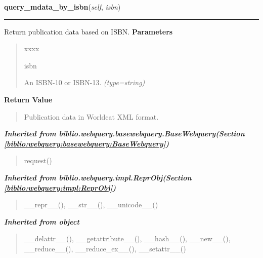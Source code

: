 \hspace{.8\funcindent}\begin{boxedminipage}{\funcwidth}

    \raggedright \textbf{query\_mdata\_by\_isbn}(\textit{self}, \textit{isbn})

    \vspace{-1.5ex}

    \rule{\textwidth}{0.5\fboxrule}
\setlength{\parskip}{2ex}

Return publication data based on ISBN.
\setlength{\parskip}{1ex}
      \textbf{Parameters}
      \vspace{-1ex}

      \begin{quote}
        \begin{Ventry}{xxxx}

          \item[isbn]


An ISBN-10 or ISBN-13.
            {\it (type=string)}

        \end{Ventry}

      \end{quote}

      \textbf{Return Value}
    \vspace{-1ex}

      \begin{quote}

Publication data in Worldcat XML format.
      \end{quote}

    \end{boxedminipage}


\large{\textbf{\textit{Inherited from biblio.webquery.basewebquery.BaseWebquery\textit{(Section \ref{biblio:webquery:basewebquery:BaseWebquery})}}}}

\begin{quote}
request()
\end{quote}

\large{\textbf{\textit{Inherited from biblio.webquery.impl.ReprObj\textit{(Section \ref{biblio:webquery:impl:ReprObj})}}}}

\begin{quote}
\_\_repr\_\_(), \_\_str\_\_(), \_\_unicode\_\_()
\end{quote}

\large{\textbf{\textit{Inherited from object}}}

\begin{quote}
\_\_delattr\_\_(), \_\_getattribute\_\_(), \_\_hash\_\_(), \_\_new\_\_(), \_\_reduce\_\_(), \_\_reduce\_ex\_\_(), \_\_setattr\_\_()
\end{quote}

